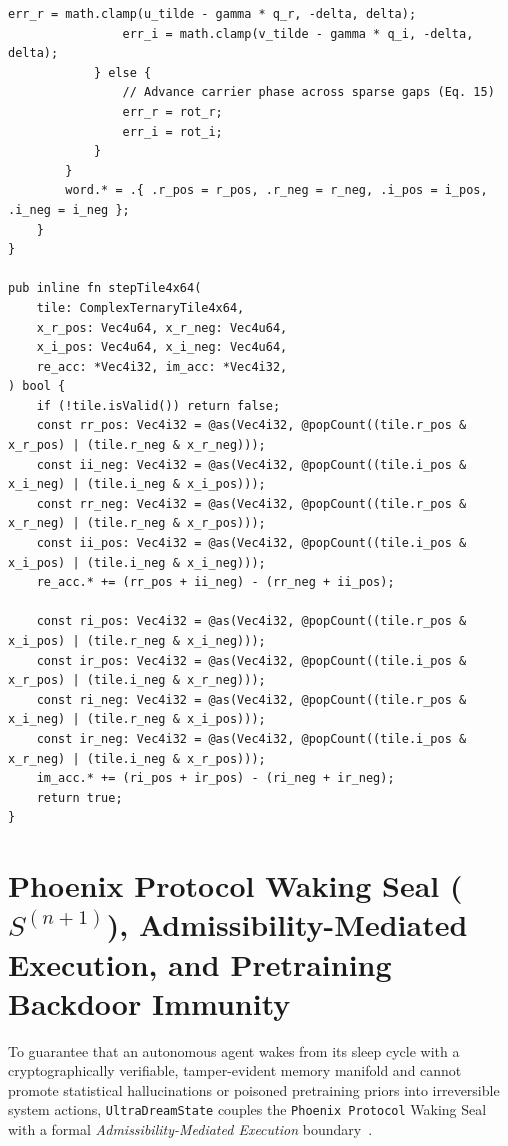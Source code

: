 \documentclass[10pt, twocolumn, a4paper]{article}
\begin{document}
\begin{lstlisting}[caption={Zero-Allocation Zig $\Sigma\Delta$ Bit-Plane Packer (with Sparse-Gap Carrier Phase Tracking) and 32-Bit Safe 4-Row SIMD Contraction Kernel.}]
                err_r = math.clamp(u_tilde - gamma * q_r, -delta, delta);
                err_i = math.clamp(v_tilde - gamma * q_i, -delta, delta);
            } else {
                // Advance carrier phase across sparse gaps (Eq. 15)
                err_r = rot_r;
                err_i = rot_i;
            }
        }
        word.* = .{ .r_pos = r_pos, .r_neg = r_neg, .i_pos = i_pos, .i_neg = i_neg };
    }
}

pub inline fn stepTile4x64(
    tile: ComplexTernaryTile4x64,
    x_r_pos: Vec4u64, x_r_neg: Vec4u64,
    x_i_pos: Vec4u64, x_i_neg: Vec4u64,
    re_acc: *Vec4i32, im_acc: *Vec4i32,
) bool {
    if (!tile.isValid()) return false;
    const rr_pos: Vec4i32 = @as(Vec4i32, @popCount((tile.r_pos & x_r_pos) | (tile.r_neg & x_r_neg)));
    const ii_neg: Vec4i32 = @as(Vec4i32, @popCount((tile.i_pos & x_i_neg) | (tile.i_neg & x_i_pos)));
    const rr_neg: Vec4i32 = @as(Vec4i32, @popCount((tile.r_pos & x_r_neg) | (tile.r_neg & x_r_pos)));
    const ii_pos: Vec4i32 = @as(Vec4i32, @popCount((tile.i_pos & x_i_pos) | (tile.i_neg & x_i_neg)));
    re_acc.* += (rr_pos + ii_neg) - (rr_neg + ii_pos);

    const ri_pos: Vec4i32 = @as(Vec4i32, @popCount((tile.r_pos & x_i_pos) | (tile.r_neg & x_i_neg)));
    const ir_pos: Vec4i32 = @as(Vec4i32, @popCount((tile.i_pos & x_r_pos) | (tile.i_neg & x_r_neg)));
    const ri_neg: Vec4i32 = @as(Vec4i32, @popCount((tile.r_pos & x_i_neg) | (tile.r_neg & x_i_pos)));
    const ir_neg: Vec4i32 = @as(Vec4i32, @popCount((tile.i_pos & x_r_neg) | (tile.i_neg & x_r_pos)));
    im_acc.* += (ri_pos + ir_pos) - (ri_neg + ir_neg);
    return true;
}
\end{lstlisting}

\section{Phoenix Protocol Waking Seal (\texorpdfstring{$S^{(n+1)}$}{S(n+1)}), Admissibility-Mediated Execution, and Pretraining Backdoor Immunity}
\label{sec:phoenix}

To guarantee that an autonomous agent wakes from its sleep cycle with a cryptographically verifiable, tamper-evident memory manifold and cannot promote statistical hallucinations or poisoned pretraining priors into irreversible system actions, \texttt{UltraDreamState} couples the \texttt{Phoenix Protocol} Waking Seal with a formal \emph{Admissibility-Mediated Execution} boundary~\cite{flyxion2026permissions, hu2026backdoors}.
\end{document}
